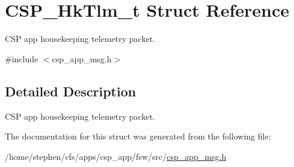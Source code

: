 \hypertarget{structCSP__HkTlm__t}{}\section{C\+S\+P\+\_\+\+Hk\+Tlm\+\_\+t Struct Reference}
\label{structCSP__HkTlm__t}


C\+SP app housekeeping telemetry packet.  




{\ttfamily \#include $<$csp\+\_\+app\+\_\+msg.\+h$>$}



\subsection{Detailed Description}
C\+SP app housekeeping telemetry packet. 

The documentation for this struct was generated from the following file\+:\begin{DoxyCompactItemize}
\item 
/home/stephen/cfs/apps/csp\+\_\+app/fsw/src/\hyperlink{csp__app__msg_8h}{csp\+\_\+app\+\_\+msg.\+h}\end{DoxyCompactItemize}
